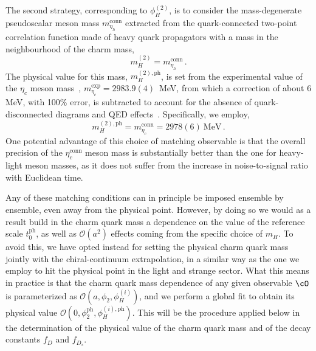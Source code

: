 The second strategy, corresponding to $\phi_H^{(2)}$, is to consider the mass-degenerate pseudoscalar meson mass $m_{\eta_h}^{\mathrm{conn}}$ extracted from the quark-connected two-point correlation function made of heavy quark propagators with a mass in the neighbourhood of the charm mass,
%
\begin{equation}
  m_H^{(2)} = m_{\eta_h}^{\mathrm{conn}}\,.
\label{eq:etac_matching}
\end{equation}
%
The physical value for this mass, $m_H^{(2), \mathrm{ph}}$,  is set from the experimental value of the $\eta_c$ meson mass~\cite{ParticleDataGroup:2022pth}, $m_{\eta_c}^{\mathrm{exp}} = 2983.9(4)\,$ MeV, from which a correction of about 6 MeV, with 100\% error, is subtracted to account for the absence of quark-disconnected diagrams and QED effects~\cite{deForcrand:2004ia, Donald:2012ga,Colquhoun:2015oha,Hatton:2020qhk,Colquhoun:2023zbc}. Specifically, we employ, 
%
\begin{equation}
  m_H^{(2), \mathrm{ph}} = m_{\eta_c}^{\mathrm{conn}} = 2978(6) \ \mathrm{MeV}\,.
\end{equation}
%
One potential advantage of this choice of matching observable is that the overall precision of the $\eta_c^{\mathrm{conn}}$ meson mass is substantially better than the one for heavy-light meson masses, as it does not suffer from the increase in noise-to-signal ratio with Euclidean time.
%

%
Any of these matching conditions can in principle be imposed ensemble by ensemble, even away from the physical point.
%
However, by doing so we would as a result build in the charm quark mass a dependence on the value of the reference scale $t_0^{\mathrm{ph}}$, as well as $\mathcal{O}(a^2)$ effects coming from the specific choice of $m_H$.
%
To avoid this, we have opted instead for setting the physical charm quark mass jointly with the chiral-continuum extrapolation, in a similar way as the one we employ to hit the physical point in the light and strange sector.
%
What this means in practice is that the charm quark mass dependence of any given observable $\cO$ is parameterized as $\mathcal{O}(a, \phi_2, \phi_H^{(i)})$, and we perform a global fit to obtain its physical value $\mathcal{O}(0, \phi_2^{\mathrm{ph}}, \phi_H^{(i),\mathrm{ph}})$.
%
This will be the procedure applied below in the determination of the physical value of the charm quark mass and of the decay constants $f_D$ and $f_{D_s}$.
%


